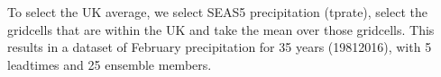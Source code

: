 \documentclass[letterpaper,10pt,english]{sphinxmanual}
\begin{document}
To select the UK average, we select SEAS5 precipitation (tprate), select the gridcells that are within the UK and take the mean over those gridcells. This results in a dataset of February precipitation for 35 years (1981\sphinxhyphen{}2016), with 5 leadtimes and 25 ensemble members.

{
\begin{sphinxVerbatim}[commandchars=\\\{\}]
\llap{\color{nbsphinxin}[11]:\,\hspace{\fboxrule}\hspace{\fboxsep}}  \PYG{p}{[}\PYG{p}{]}
              
            \PYG{p}{[} \PYG{p}{]}
\end{sphinxVerbatim}
}
\end{document}
